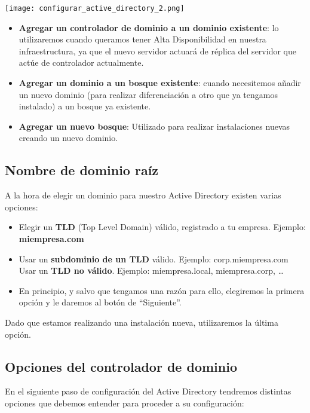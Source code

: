 \begin{center}
    \vspace{-15pt}
    \texttt{[image: configurar\_active\_directory\_2.png]}
    \vspace{-15pt}
\end{center}

\begin{itemize}
    \item \textbf{Agregar un controlador de dominio a un dominio existente}: lo utilizaremos cuando queramos tener Alta Disponibilidad en nuestra infraestructura, ya que el nuevo servidor actuará de réplica del servidor que actúe de controlador actualmente.
    \item \textbf{Agregar un dominio a un bosque existente}: cuando necesitemos añadir un nuevo dominio (para realizar diferenciación a otro que ya tengamos instalado) a un bosque ya existente.
    \item \textbf{Agregar un nuevo bosque}: Utilizado para realizar instalaciones nuevas creando un nuevo dominio.
\end{itemize}

\subsection{Nombre de dominio raíz}
A la hora de elegir un dominio para nuestro Active Directory existen varias opciones:

\begin{itemize}
    \item Elegir un \textbf{TLD} (Top Level Domain) válido, registrado a tu empresa. Ejemplo: \textbf{miempresa.com}
    \item Usar un \textbf{subdominio de un TLD} válido. Ejemplo: corp.miempresa.com
    Usar un \textbf{TLD no válido}. Ejemplo: miempresa.local, miempresa.corp, …
    \item En principio, y salvo que tengamos una razón para ello, elegiremos la primera opción y le daremos al botón de “Siguiente”.
\end{itemize}

Dado que estamos realizando una instalación nueva, utilizaremos la última opción.

\subsection{Opciones del controlador de dominio}
En el siguiente paso de configuración del Active Directory tendremos distintas opciones que debemos entender para proceder a su configuración:

